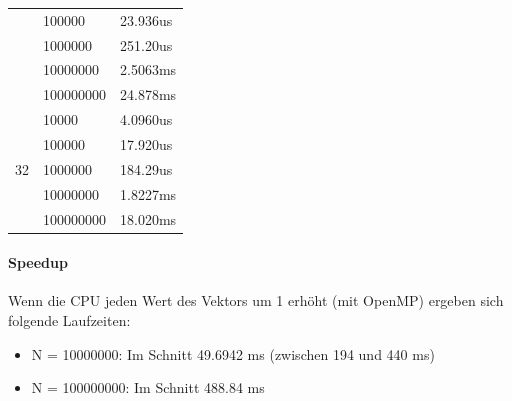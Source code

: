 \documentclass{report}
\begin{document}
\begin{center}
\begin{tabular}{|c|l|l|}
		& 100000    & 23.936us                                                                                   \\ \cline{2-3} 
		& 1000000   & 251.20us                                                                                  \\ \cline{2-3} 
		& 10000000  & 2.5063ms                                                                                  \\ \cline{2-3} 
		& 100000000 & 24.878ms                                                                                 \\ \hline
		\multirow{5}{*}{32}             & 10000     & 4.0960us                                                                                   \\ \cline{2-3} 
		& 100000    & 17.920us                                                                                   \\ \cline{2-3} 
		& 1000000   & 184.29us                                                                                   \\ \cline{2-3} 
		& 10000000  & 1.8227ms                                                                                   \\ \cline{2-3} 
		& 100000000 & 18.020ms                                                                                  \\ \hline
	\end{tabular}
\end{center}

\paragraph{Speedup} 
Wenn die CPU jeden Wert des Vektors um 1 erhöht (mit OpenMP) ergeben sich folgende Laufzeiten:\\
\begin{itemize}
	\item N = 10000000:  Im Schnitt 49.6942 ms (zwischen 194 und 440 ms)
	\item N = 100000000: Im Schnitt 488.84 ms
\end{itemize}
\end{document}
